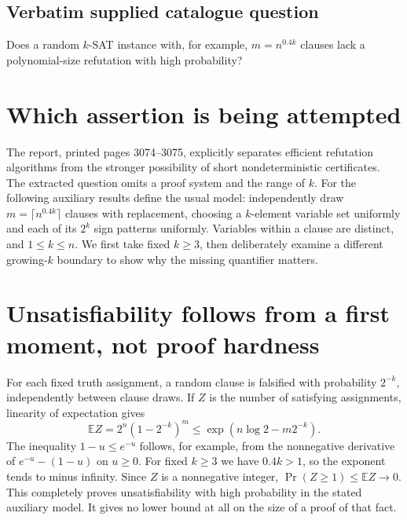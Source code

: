 \documentclass[11pt]{article}
\begin{document}
\subsection{Verbatim supplied catalogue question}
Does a random $k$-SAT instance with, for example, $m=n^{0.4k}$ clauses lack a polynomial-size refutation with high probability?

\section{Which assertion is being attempted}
The report, printed pages 3074--3075, explicitly separates efficient
refutation algorithms from the stronger possibility of short
nondeterministic certificates. The extracted question omits a proof
system and the range of $k$. For the following auxiliary results define
the usual model: independently draw $m=\lceil n^{0.4k}\rceil$ clauses
with replacement, choosing a $k$-element variable set uniformly and each
of its $2^k$ sign patterns uniformly. Variables within a clause are
distinct, and $1\le k\le n$.
We first take fixed $k\ge3$, then deliberately examine a different
growing-$k$ boundary to show why the missing quantifier matters.

\section{Unsatisfiability follows from a first moment, not proof hardness}
For each fixed truth assignment, a random clause is falsified with
probability $2^{-k}$, independently between clause draws. If $Z$ is the
number of satisfying assignments, linearity of expectation gives
\[
\mathbb E Z=2^n(1-2^{-k})^m
\le\exp(n\log2-m2^{-k}).
\]
The inequality $1-u\le e^{-u}$ follows, for example, from the
nonnegative derivative of $e^{-u}-(1-u)$ on $u\ge0$.
For fixed $k\ge3$ we have $0.4k>1$, so the exponent tends to minus
infinity. Since $Z$ is a nonnegative integer,
$\Pr(Z\ge1)\le\mathbb EZ\to0$. This completely proves
unsatisfiability with high probability in the stated auxiliary model.
It gives no lower bound at all on the size of a proof of that fact.
\end{document}
